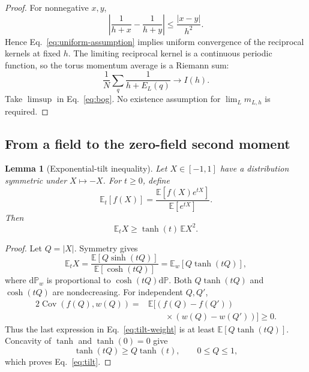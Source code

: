 \documentclass[aps,prb,twocolumn,groupedaddress,amsmath,amssymb,
               superscriptaddress,nofootinbib,floatfix]{revtex4-2}
\theoremstyle{plain}
\newtheorem{lemma}{Lemma}
\theoremstyle{definition}
\newcommand{\dd}{\mathrm{d}}
\begin{document}
\begin{proof}
For nonnegative $x,y$,
\begin{equation}
 \left|\frac1{h+x}-\frac1{h+y}\right|
 \le\frac{|x-y|}{h^2}.
\end{equation}
Hence Eq.~\eqref{eq:uniform-assumption} implies uniform convergence of the
reciprocal kernels at fixed $h$.  The limiting reciprocal kernel is a
continuous periodic function, so the torus momentum average is a Riemann
sum:
\begin{equation}
 \frac1N\sum_q\frac1{h+E_L(q)}
 \longrightarrow I(h).
\label{eq:riemann}
\end{equation}
Take $\limsup$ in Eq.~\eqref{eq:bog}.  No existence assumption for
$\lim_Lm_{L,h}$ is required.
\end{proof}

\subsection{From a field to the zero-field second moment}

\begin{lemma}[Exponential-tilt inequality]
\label{lem:tilt}
Let $X\in[-1,1]$ have a distribution symmetric under $X\mapsto-X$.  For
$t\ge0$, define
\begin{equation}
 \mathbb E_t[f(X)]
 =
 \frac{\mathbb E[f(X)e^{tX}]}{\mathbb E[e^{tX}]}.
\end{equation}
Then
\begin{equation}
 \boxed{\mathbb E_tX\ge\tanh(t)\,\mathbb EX^2.}
\label{eq:tilt}
\end{equation}
\end{lemma}

\begin{proof}
Let $Q=|X|$.  Symmetry gives
\begin{equation}
 \mathbb E_tX
 =
 \frac{\mathbb E[Q\sinh(tQ)]}{\mathbb E[\cosh(tQ)]}
 =
 \mathbb E_w[Q\tanh(tQ)],
\label{eq:tilt-weight}
\end{equation}
where $\dd\mathbb P_w$ is proportional to
$\cosh(tQ)\dd\mathbb P$.  Both $Q\tanh(tQ)$ and $\cosh(tQ)$ are
nondecreasing.  For independent $Q,Q'$,
\begin{align}
 2\operatorname{Cov}(f(Q),w(Q))
 ={}&\mathbb E\bigl[(f(Q)-f(Q'))\nonumber\\
 &\qquad{}\times(w(Q)-w(Q'))\bigr]\ge0.
\end{align}
Thus the last expression in Eq.~\eqref{eq:tilt-weight} is at least
$\mathbb E[Q\tanh(tQ)]$.  Concavity of $\tanh$ and $\tanh(0)=0$ give
\begin{equation}
 \tanh(tQ)\ge Q\tanh(t),
 \qquad0\le Q\le1,
\end{equation}
which proves Eq.~\eqref{eq:tilt}.
\end{proof}
\end{document}

